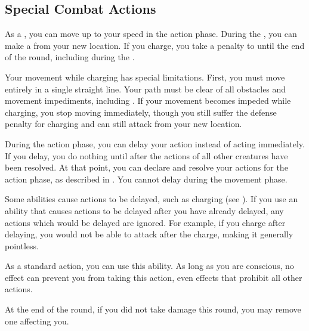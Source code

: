     \subsection{Special Combat Actions}

        \label{Charge} As a , you can move up to your speed in the action phase.
        During the , you can make a  from your new location.
        If you charge, you take a  penalty to  until the end of the round, including during the .

        \par Your movement while charging has special limitations.
        First, you must move entirely in a single straight line.
        Your path must be clear of all obstacles and movement impediments, including .
        If your movement becomes impeded while charging, you stop moving immediately, though you still suffer the defense penalty for charging and can still attack from your new location.

        \label{Delay}
        During the action phase, you can delay your action instead of acting immediately.
        If you delay, you do nothing until after the actions of all other creatures have been resolved.
        At that point, you can declare and resolve your actions for the action phase, as described in .
        You cannot delay during the movement phase.

        Some abilities cause actions to be delayed, such as charging (see ).
        If you use an ability that causes actions to be delayed after you have already delayed, any actions which would be delayed are ignored.
        For example, if you charge after delaying, you would not be able to attack after the charge, making it generally pointless.

        \label{Desperate Recovery}
        As a standard action, you can use this ability.
        As long as you are conscious, no effect can prevent you from taking this action, even effects that prohibit all other actions.
        \begin{ability}
            \begin{spelleffects}
                \spelleffect At the end of the round, if you did not take damage this round, you may remove one  affecting you.
            \end{spelleffects}
        \end{ability}

